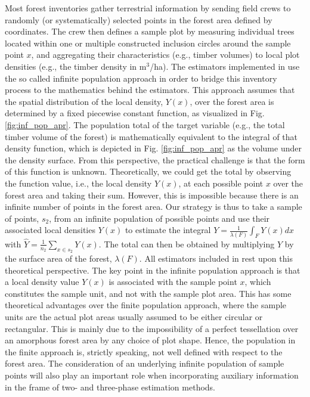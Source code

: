Most forest inventories gather terrestrial information by sending field crews to randomly (or systematically) selected points in the forest area defined by coordinates. The crew then defines a sample plot by measuring individual trees located within one or multiple constructed inclusion circles around the sample point $x$, and aggregating their characteristics (e.g., timber volumes) to local plot densities (e.g., the timber density in m$^3$/ha). The estimators implemented in  use the so called infinite population approach in order to bridge this inventory process to the mathematics behind the estimators. This approach assumes that the spatial distribution of the local density, $Y(x)$, over the forest area is determined by a fixed piecewise constant function, as visualized in Fig. \ref{fig:inf_pop_apr}. The population total of the target variable (e.g., the total timber volume of the forest) is mathematically equivalent to the integral of that density function, which is depicted in Fig. \ref{fig:inf_pop_apr} as the volume under the density surface. From this perspective, the practical challenge is that the form of this function is unknown. Theoretically, we could get the total by observing the function value, i.e., the local density $Y(x)$, at each possible point $x$ over the forest area and taking their sum. However, this is impossible because there is an infinite number of points in the forest area. Our strategy is thus to take a sample of points, $s_2$, from an infinite population of possible points and use their associated local densities $Y(x)$ to estimate the integral $Y=\frac{1}{\lambda(F)}\int_{F}Y(x)dx$ with $\hat{Y}=\frac{1}{n_2}\sum_{x \in s_2}Y(x)$. The total can then be obtained by multiplying $\hat{Y}$ by the surface area of the forest, $\lambda(F)$. All estimators included in  rest upon this theoretical perspective. The key point in the infinite population approach is that a local density value $Y(x)$ is associated with the sample point $x$, which constitutes the sample unit, and not with the sample plot area. This has some theoretical advantages over the finite population approach, where the sample units are the actual plot areas usually assumed to be either circular or rectangular.  This is mainly due to the impossibility of a perfect tessellation over an amorphous forest area by any choice of plot shape. Hence, the population in the finite approach is, strictly speaking, not well defined with respect to the forest area. The consideration of an underlying infinite population of sample points will also play an important role when incorporating auxiliary information in the frame of two- and three-phase estimation methods.

